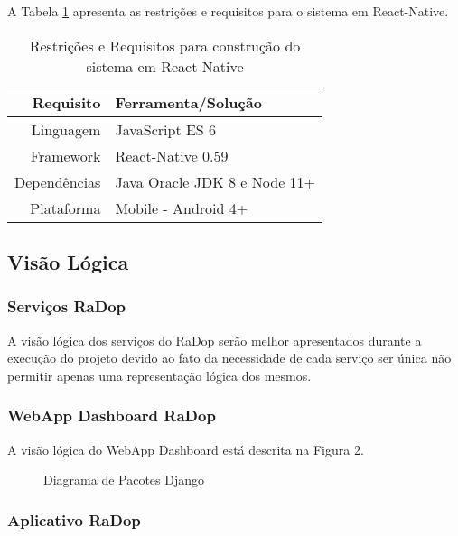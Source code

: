 A Tabela \ref{tab:app} apresenta as restrições e requisitos para o sistema em React-Native.

\begin{table}[h]
\centering
\caption{Restrições e Requisitos para construção do sistema em React-Native}
\label{tab:app}
  \begin{tabular}{|r|l|}
  \hline
  \textbf{Requisito} & \textbf{Ferramenta/Solução}  \\ \hline
  Linguagem          & JavaScript ES 6              \\ \hline
  Framework          & React-Native 0.59            \\ \hline
  Dependências       & Java Oracle JDK 8 e Node 11+ \\ \hline
  Plataforma         & Mobile - Android 4+          \\ \hline
  \end{tabular}
\end{table}

\subsection{Visão Lógica}\label{visao-logica}

\subsubsection{Serviços RaDop}\label{servicos-radop}

A visão lógica dos serviços do RaDop serão melhor apresentados durante a
execução do projeto devido ao fato da necessidade de cada serviço ser
única não permitir apenas uma representação lógica dos mesmos.

\subsubsection{WebApp Dashboard RaDop}\label{visao-webapp-dashboard-radop}

A visão lógica do WebApp Dashboard está descrita na Figura 2.

\begin{figure}[!htb]
    \caption{\label{fig:diagrama-pact-django} Diagrama de Pacotes Django}
\end{figure}

\subsubsection{Aplicativo RaDop}\label{visao-aplicativo-radop}

